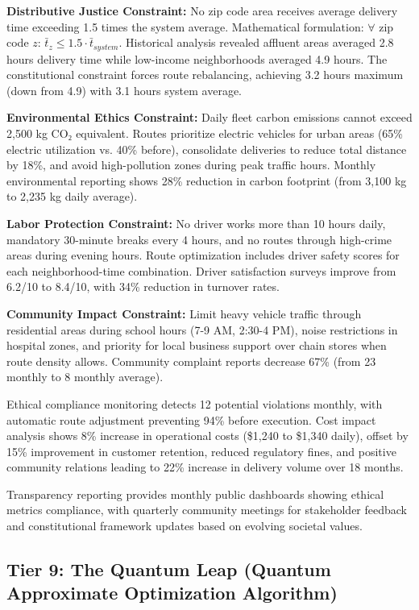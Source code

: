 \documentclass{article}
\begin{document}
\textbf{Distributive Justice Constraint:} No zip code area receives average delivery time exceeding 1.5 times the system average. Mathematical formulation: $\forall$ zip code $z$: $\bar{t}_z \leq 1.5 \cdot \bar{t}_{system}$. Historical analysis revealed affluent areas averaged 2.8 hours delivery time while low-income neighborhoods averaged 4.9 hours. The constitutional constraint forces route rebalancing, achieving 3.2 hours maximum (down from 4.9) with 3.1 hours system average.

\textbf{Environmental Ethics Constraint:} Daily fleet carbon emissions cannot exceed 2,500 kg CO₂ equivalent. Routes prioritize electric vehicles for urban areas (65\% electric utilization vs. 40\% before), consolidate deliveries to reduce total distance by 18\%, and avoid high-pollution zones during peak traffic hours. Monthly environmental reporting shows 28\% reduction in carbon footprint (from 3,100 kg to 2,235 kg daily average).

\textbf{Labor Protection Constraint:} No driver works more than 10 hours daily, mandatory 30-minute breaks every 4 hours, and no routes through high-crime areas during evening hours. Route optimization includes driver safety scores for each neighborhood-time combination. Driver satisfaction surveys improve from 6.2/10 to 8.4/10, with 34\% reduction in turnover rates.

\textbf{Community Impact Constraint:} Limit heavy vehicle traffic through residential areas during school hours (7-9 AM, 2:30-4 PM), noise restrictions in hospital zones, and priority for local business support over chain stores when route density allows. Community complaint reports decrease 67\% (from 23 monthly to 8 monthly average).

Ethical compliance monitoring detects 12 potential violations monthly, with automatic route adjustment preventing 94\% before execution. Cost impact analysis shows 8\% increase in operational costs (\$1,240 to \$1,340 daily), offset by 15\% improvement in customer retention, reduced regulatory fines, and positive community relations leading to 22\% increase in delivery volume over 18 months.

Transparency reporting provides monthly public dashboards showing ethical metrics compliance, with quarterly community meetings for stakeholder feedback and constitutional framework updates based on evolving societal values.

\subsection{Tier 9: The Quantum Leap (Quantum Approximate Optimization Algorithm)}
\end{document}
